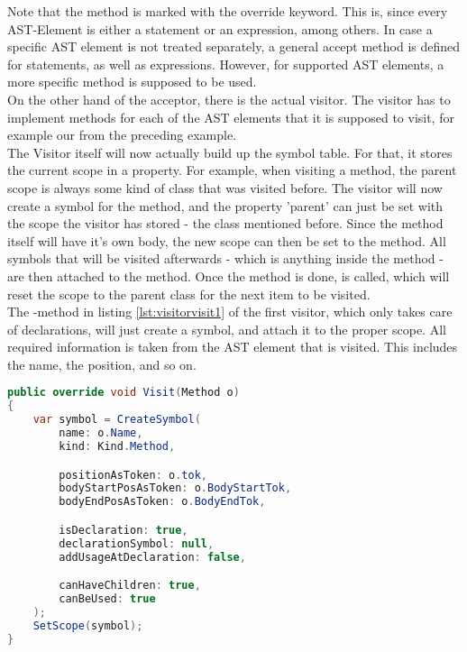 Note that the method is marked with the override keyword.
This is, since every AST-Element is either a statement or an expression, among others.
In case a specific AST element is not treated separately, a general accept method is defined for statements, as well as expressions.
However, for supported AST elements, a more specific method is supposed to be used.\\

On the other hand of the acceptor, there is the actual visitor.
The visitor has to implement  methods for each of the AST elements that it is supposed to visit, for example our  from the preceding example.\\

The Visitor itself will now actually build up the symbol table.
For that, it stores the current scope in a property.
For example, when visiting a method, the parent scope is always some kind of class that was visited before.
The visitor will now create a symbol for the method, and the property 'parent' can just be set with the scope the visitor has stored - the class mentioned before.
Since the method itself will have it's own body, the new scope can then be set to the method.
All symbols that will be visited afterwards - which is anything inside the method - are then attached to the method.
Once the method is done,  is called, which will reset the scope to the parent class for the next item to be visited.\\

The -method in listing \ref{lst:visitorvisit1} of the first visitor, which only takes care of declarations, will just create a symbol, and attach it to the proper scope.
All required information is taken from the AST element that is visited.
This includes the name, the position, and so on.\\

\begin{lstlisting}[language=csharp, caption={Visiting a Method}, captionpos=b, label={lst:visitorvisit1}]
public override void Visit(Method o)
{
    var symbol = CreateSymbol(
        name: o.Name,
        kind: Kind.Method,

        positionAsToken: o.tok,
        bodyStartPosAsToken: o.BodyStartTok,
        bodyEndPosAsToken: o.BodyEndTok,

        isDeclaration: true,
        declarationSymbol: null,
        addUsageAtDeclaration: false,

        canHaveChildren: true,
        canBeUsed: true
    );
    SetScope(symbol);
}
\end{lstlisting}

